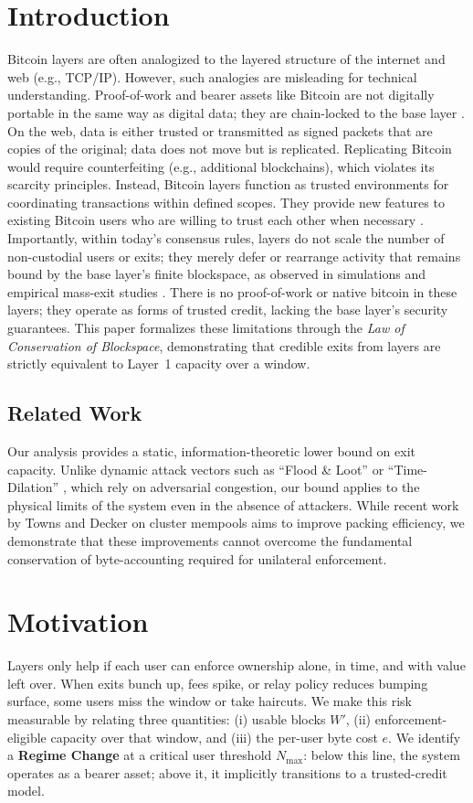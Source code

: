 \documentclass{article}
\theoremstyle{definition}
\begin{document}
\section{Introduction}
Bitcoin layers are often analogized to the layered structure of the internet and web (e.g., TCP/IP). However, such analogies are misleading for technical understanding. Proof-of-work and bearer assets like Bitcoin are not digitally portable in the same way as digital data; they are chain-locked to the base layer \cite{lightning}. On the web, data is either trusted or transmitted as signed packets that are copies of the original; data does not move but is replicated. Replicating Bitcoin would require counterfeiting (e.g., additional blockchains), which violates its scarcity principles.
Instead, Bitcoin layers function as trusted environments for coordinating transactions within defined scopes. They provide new features to existing Bitcoin users who are willing to trust each other when necessary \cite{factory,ark}. Importantly, within today's consensus rules, layers do not scale the number of non-custodial users or exits; they merely defer or rearrange activity that remains bound by the base layer's finite blockspace, as observed in simulations and empirical mass-exit studies \cite{sguanci2022,Law2023}.
There is no proof-of-work or native bitcoin in these layers; they operate as forms of trusted credit, lacking the base layer's security guarantees. This paper formalizes these limitations through the \emph{Law of Conservation of Blockspace}, demonstrating that credible exits from layers are strictly equivalent to Layer~1 capacity over a window.

\subsection*{Related Work}
Our analysis provides a static, information-theoretic lower bound on exit capacity. Unlike dynamic attack vectors such as ``Flood \& Loot'' \cite{harrisZohar} or ``Time-Dilation'' \cite{riardNaumenko}, which rely on adversarial congestion, our bound applies to the physical limits of the system even in the absence of attackers. While recent work by Towns and Decker \cite{deckerTowns} on cluster mempools aims to improve packing efficiency, we demonstrate that these improvements cannot overcome the fundamental conservation of byte-accounting required for unilateral enforcement.

\section{Motivation}
Layers only help if each user can enforce ownership alone, in time, and with value left over. When exits bunch up, fees spike, or relay policy reduces bumping surface, some users miss the window or take haircuts. We make this risk measurable by relating three quantities: (i) usable blocks $W'$, (ii) enforcement-eligible capacity over that window, and (iii) the per-user byte cost $e$. We identify a \textbf{Regime Change} at a critical user threshold $N_{\max}$: below this line, the system operates as a bearer asset; above it, it implicitly transitions to a trusted-credit model.
\end{document}

